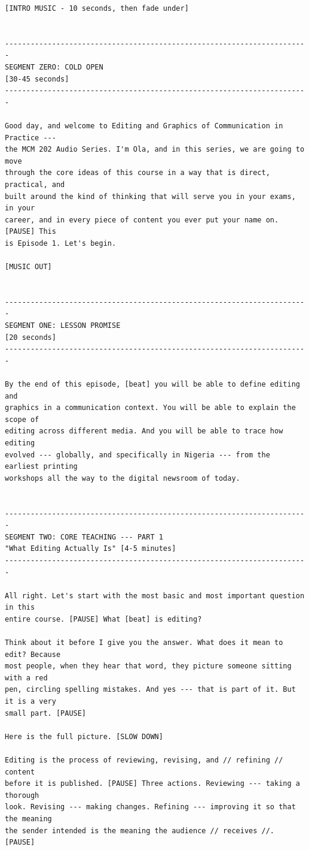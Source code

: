 {\begin{Verbatim}
[INTRO MUSIC - 10 seconds, then fade under]


-----------------------------------------------------------------------
SEGMENT ZERO: COLD OPEN
[30-45 seconds]
-----------------------------------------------------------------------

Good day, and welcome to Editing and Graphics of Communication in Practice ---
the MCM 202 Audio Series. I'm Ola, and in this series, we are going to move
through the core ideas of this course in a way that is direct, practical, and
built around the kind of thinking that will serve you in your exams, in your
career, and in every piece of content you ever put your name on. [PAUSE] This
is Episode 1. Let's begin.

[MUSIC OUT]


-----------------------------------------------------------------------
SEGMENT ONE: LESSON PROMISE
[20 seconds]
-----------------------------------------------------------------------

By the end of this episode, [beat] you will be able to define editing and
graphics in a communication context. You will be able to explain the scope of
editing across different media. And you will be able to trace how editing
evolved --- globally, and specifically in Nigeria --- from the earliest printing
workshops all the way to the digital newsroom of today.


-----------------------------------------------------------------------
SEGMENT TWO: CORE TEACHING --- PART 1
"What Editing Actually Is" [4-5 minutes]
-----------------------------------------------------------------------

All right. Let's start with the most basic and most important question in this
entire course. [PAUSE] What [beat] is editing?

Think about it before I give you the answer. What does it mean to edit? Because
most people, when they hear that word, they picture someone sitting with a red
pen, circling spelling mistakes. And yes --- that is part of it. But it is a very
small part. [PAUSE]

Here is the full picture. [SLOW DOWN]

Editing is the process of reviewing, revising, and // refining // content
before it is published. [PAUSE] Three actions. Reviewing --- taking a thorough
look. Revising --- making changes. Refining --- improving it so that the meaning
the sender intended is the meaning the audience // receives //. [PAUSE]


\end{Verbatim}}
